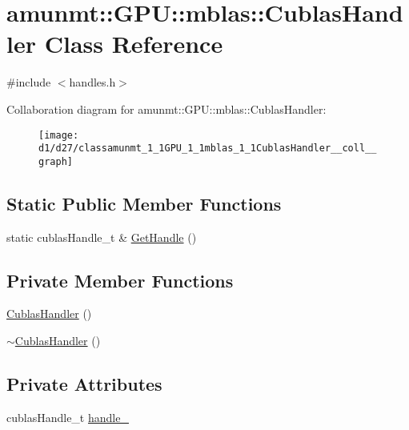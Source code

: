 \hypertarget{classamunmt_1_1GPU_1_1mblas_1_1CublasHandler}{}\section{amunmt\+:\+:G\+PU\+:\+:mblas\+:\+:Cublas\+Handler Class Reference}
\label{classamunmt_1_1GPU_1_1mblas_1_1CublasHandler}


{\ttfamily \#include $<$handles.\+h$>$}



Collaboration diagram for amunmt\+:\+:G\+PU\+:\+:mblas\+:\+:Cublas\+Handler\+:
\nopagebreak
\begin{figure}[H]
\begin{center}
\leavevmode
\texttt{[image: d1/d27/classamunmt\_1\_1GPU\_1\_1mblas\_1\_1CublasHandler\_\_coll\_\_graph]}
\end{center}
\end{figure}
\subsection*{Static Public Member Functions}
\begin{DoxyCompactItemize}
\item 
static cublas\+Handle\+\_\+t \& \hyperlink{classamunmt_1_1GPU_1_1mblas_1_1CublasHandler_a8259296c298b79e8b742e6157a7f8a02}{Get\+Handle} ()
\end{DoxyCompactItemize}
\subsection*{Private Member Functions}
\begin{DoxyCompactItemize}
\item 
\hyperlink{classamunmt_1_1GPU_1_1mblas_1_1CublasHandler_aa2e4a863191a149911d71111832b16c9}{Cublas\+Handler} ()
\item 
\hyperlink{classamunmt_1_1GPU_1_1mblas_1_1CublasHandler_abe4bb4660639c58fb086d2f308980c0e}{$\sim$\+Cublas\+Handler} ()
\end{DoxyCompactItemize}
\subsection*{Private Attributes}
\begin{DoxyCompactItemize}
\item 
cublas\+Handle\+\_\+t \hyperlink{classamunmt_1_1GPU_1_1mblas_1_1CublasHandler_a2e032d5257f286f3f829b5e684525121}{handle\+\_\+}
\end{DoxyCompactItemize}
